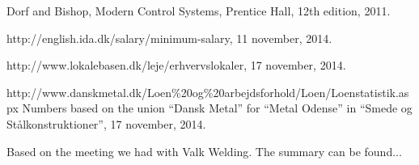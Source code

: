 \begin{thebibliography}{9}
	Dorf and Bishop,
	Modern Control Systems,
	Prentice Hall, 
	12th edition, 
	2011.

	http://english.ida.dk/salary/minimum-salary,
	11 november,
	2014.
	
	http://www.lokalebasen.dk/leje/erhvervslokaler,
	17 november,
	2014.
	
	http://www.danskmetal.dk/Loen\%20og\%20arbejdsforhold/Loen/Loenstatistik.aspx 
	Numbers based on the union ``Dansk Metal'' for ``Metal Odense'' in ``Smede og Stålkonstruktioner'',
	17 november,
	2014. 
	
	Based on the meeting we had with Valk Welding.
	The summary can be found...
	
\end{thebibliography}
